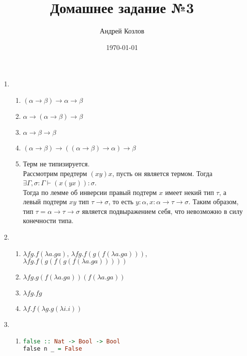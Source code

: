 \documentclass[12pt,a4paper]{article}
\begin{document}
\title{Домашнее задание №3}
\author{Андрей Козлов}
\date{\today}

\maketitle

\begin{enumerate}
\item {
	\begin{enumerate}
		\item $(\alpha \rightarrow \beta) \rightarrow \alpha \rightarrow \beta$
		\item $\alpha \rightarrow (\alpha \rightarrow \beta) \rightarrow \beta$
		\item $\alpha \rightarrow \beta \rightarrow \beta$
		\item $(\alpha \rightarrow \beta) \rightarrow ((\alpha \rightarrow \beta) \rightarrow \alpha) \rightarrow \beta$
		\item {
			Терм не типизируется.\\
			Рассмотрим предтерм $(x y) x$, пусть он является термом. Тогда $\exists \Gamma, \sigma \colon \Gamma \vdash (x (y x)) \colon \sigma$.\\
			Тогда по лемме об инверсии правый подтерм $x$ имеет некий тип $\tau$, а левый подтерм $x y$ тип $\tau \rightarrow \sigma$, то есть $y \colon \alpha, x \colon \alpha \rightarrow \tau \rightarrow \sigma$. Таким образом, тип $\tau =  \alpha \rightarrow \tau \rightarrow \sigma$ является подвыражением себя, что невозможно в силу конечности типа.
		}
	\end{enumerate}
}
\item {
	\begin{enumerate}
		\item $\lambda f g . f (\lambda a . g a)$, $\lambda f g . f (g (f (\lambda a . g a)))$, $\lambda f g . f ( g (f (g (f (\lambda a . g a)))))$
		\item $\lambda f g . g (f (\lambda a . g a)) (f (\lambda a . g a))$
		\item $\lambda f g . f g$
		\item $\lambda f . f (\lambda g . g (\lambda i . i))$
	\end{enumerate}
}
\item
{
	\begin{enumerate}
		\item {
			\begin{lstlisting}[language=Haskell]
false :: Nat -> Bool -> Bool
false n _ = False


\end{lstlisting}}
\end{enumerate}}
\end{enumerate}
\end{document}
